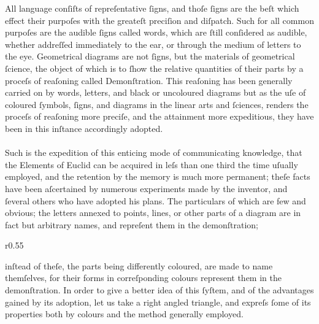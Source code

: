 All language conſiſts of repreſentative ſigns, and thoſe ſigns are the beſt which effect their purpoſes with the greateſt preciſion and diſpatch. Such for all common purpoſes are the audible ſigns called words, which are ſtill conſidered as audible, whether addreſſed immediately to the ear, or through the medium of letters to the eye. Geometrical diagrams are not ſigns, but the materials of geometrical ſcience, the object of which is to ſhow the relative quantities of their parts by a proceſs of reaſoning called Demonſtration.  This reaſoning has been generally carried on by words, letters, and black or uncoloured diagrams but as the uſe of coloured ſymbols, ſigns, and diagrams in the linear arts and ſciences, renders the proceſs of reaſoning more preciſe, and the attainment more expeditious, they have been in this inſtance accordingly adopted.\\
\hfill\\
Such is the expedition of this enticing mode of communicating knowledge, that the Elements of Euclid can be acquired in leſs than one third the time uſually employed, and the retention by the memory is much more permanent; theſe facts have been aſcertained by numerous experiments made by the inventor, and ſeveral others who have adopted his plans. The particulars of which are few and obvious; the letters annexed to points, lines, or other parts of a diagram are in fact but arbitrary names, and repreſent them in the demonſtration;
\begin{wrapfigure}{r}{0.55\textwidth}
    \centering
    
\end{wrapfigure}
inſtead of theſe, the parts being differently coloured, are made to name themſelves, for their forms in correſponding colours represent them in the demonſtration. In order to give a better idea of this ſyſtem, and of the advantages gained by its adoption, let us take a right angled triangle, and expreſs ſome of its properties both by colours and the
method generally employed.\\

